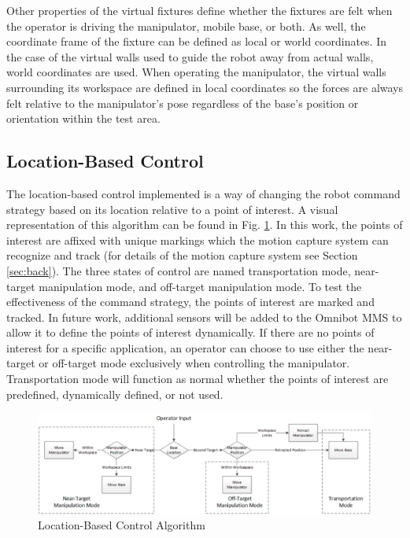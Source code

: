 \documentclass[onecolumn,10pt,final]{asme2ej}
\begin{document}
Other properties of the virtual fixtures define whether the fixtures are felt when the operator is driving the manipulator, mobile base, or both. As well, the coordinate frame of the fixture can be defined as local or world coordinates. In the case of the virtual walls used to guide the robot away from actual walls, world coordinates are used. When operating the manipulator, the virtual walls surrounding its workspace are defined in local coordinates so the forces are always felt relative to the manipulator's pose regardless of the base's position or orientation within the test area.\\

\subsection{Location-Based Control}

The location-based control implemented is a way of changing the robot command strategy based on its location relative to a point of interest. A visual representation of this algorithm can be found in Fig. \ref{fig:flow}. In this work, the points of interest are affixed with unique markings which the motion capture system can recognize and track (for details of the motion capture system see Section \ref{sec:back}). The three states of control are named transportation mode, near-target manipulation mode, and off-target manipulation mode. To test the effectiveness of the command strategy, the points of interest are marked and tracked. In future work, additional sensors will be added to the Omnibot MMS to allow it to define the points of interest dynamically. If there are no points of interest for a specific application, an operator can choose to use either the near-target or off-target mode exclusively when controlling the manipulator. Transportation mode will function as normal whether the points of interest are predefined, dynamically defined, or not used.\\

\begin{figure}[htbp!]
    \centering
    \includegraphics[width=\textwidth]{Drawing24.png}
    \caption{Location-Based Control Algorithm}
    \label{fig:flow}
\end{figure} 
\end{document}
